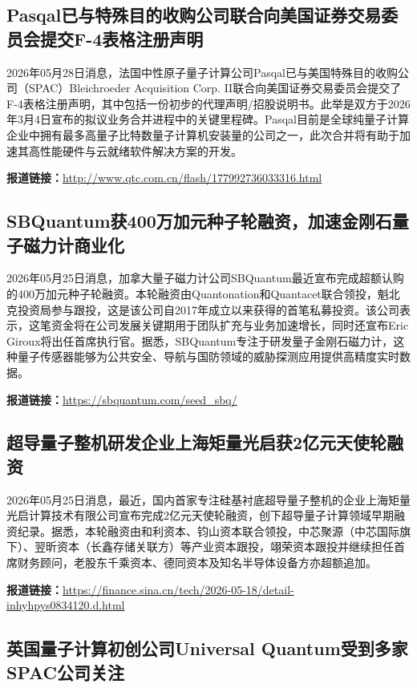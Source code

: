 \documentclass[12pt,a4paper]{ctexart}
\begin{document}
\subsection{ Pasqal已与特殊目的收购公司联合向美国证券交易委员会提交F-4表格注册声明 }

2026年05月28日消息，法国中性原子量子计算公司Pasqal已与美国特殊目的收购公司（SPAC）Bleichroeder Acquisition Corp. II联合向美国证券交易委员会提交了F-4表格注册声明，其中包括一份初步的代理声明/招股说明书。此举是双方于2026年3月4日宣布的拟议业务合并进程中的关键里程碑。Pasqal目前是全球纯量子计算企业中拥有最多高量子比特数量子计算机安装量的公司之一，此次合并将有助于加速其高性能硬件与云就绪软件解决方案的开发。

\noindent\textbf{报道链接：}\url{http://www.qtc.com.cn/flash/177992736033316.html }

\subsection{ SBQuantum获400万加元种子轮融资，加速金刚石量子磁力计商业化 }

2026年05月25日消息，加拿大量子磁力计公司SBQuantum最近宣布完成超额认购的400万加元种子轮融资。本轮融资由Quantonation和Quantacet联合领投，魁北克投资局参与跟投，这是该公司自2017年成立以来获得的首笔私募投资。该公司表示，这笔资金将在公司发展关键期用于团队扩充与业务加速增长，同时还宣布Eric Giroux将出任首席执行官。据悉，SBQuantum专注于研发量子金刚石磁力计，这种量子传感器能够为公共安全、导航与国防领域的威胁探测应用提供高精度实时数据。

\noindent\textbf{报道链接：}\url{https://sbquantum.com/seed\_sbq/ }

\subsection{ 超导量子整机研发企业上海矩量光启获2亿元天使轮融资 }

2026年05月25日消息，最近，国内首家专注硅基衬底超导量子整机的企业上海矩量光启计算技术有限公司宣布完成2亿元天使轮融资，创下超导量子计算领域早期融资纪录。据悉，本轮融资由和利资本、钧山资本联合领投，中芯聚源（中芯国际旗下）、翌昕资本（长鑫存储关联方）等产业资本跟投，翊荣资本跟投并继续担任首席财务顾问，老股东千乘资本、德同资本及知名半导体设备方亦超额追加。

\noindent\textbf{报道链接：}\url{https://finance.sina.cn/tech/2026-05-18/detail-inhyhpys0834120.d.html }

\subsection{ 英国量子计算初创公司Universal Quantum受到多家SPAC公司关注 }
\end{document}
